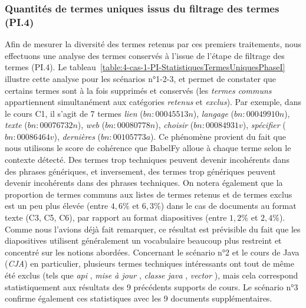 \bigskip




\subsubsection{Quantités de termes uniques issus du filtrage des termes (PI.4)}
\label{subsubsection:Evaluation:DeroulementExperimentations:ValidationStructurelle:ResultatsTermesUniquesFiltrageTermes}

Afin de mesurer la diversité des termes retenus par ces premiers traitements, nous effectuons une analyse des termes  conservés à l'issue de l'étape de filtrage des termes (PI.4).
Le tableau~\ref{table:4-cas-1-PI-StatistiquesTermesUniquesPhaseI} illustre cette analyse pour les scénarios n°1-2-3, et permet de constater que certains termes sont à la fois supprimés et conservés (les \textit{termes communs} appartiennent simultanément aux catégories \textit{retenus} et \textit{exclus}).
Par exemple, dans le cours C1, il s'agit de 7 termes \og \textit{lien} \fg ($bn{:}00045513n$), \og \textit{langage} \fg ($bn{:}00049910n$), \og \textit{texte} \fg ($bn{:}00076732n$), \og \textit{web} \fg ($bn{:}00080778n$), \og \textit{choisir} \fg ($bn{:}00084931v$), \og \textit{spécifier} \fg ($bn{:}00086464v$), \og \textit{dernières} \fg ($bn{:}00105773a$).
Ce phénomène provient du fait que nous utilisons le score de cohérence que BabelFy alloue à chaque terme selon le contexte détecté.
Des termes trop techniques peuvent devenir incohérents dans des phrases génériques, et inversement, des termes trop génériques peuvent devenir incohérents dans des phrases techniques.
On notera également que la proportion de termes communs aux listes de termes retenus et de termes exclus est un peu plus élevée (entre $ 4,6 \% $ et $ 6,3 \% $) dans le cas de documents au format texte (C3, C5, C6), par rapport au format diapositives (entre $ 1,2 \% $ et $ 2,4 \% $).
Comme nous l'avions déjà fait remarquer, ce résultat est prévisible du fait que les diapositives utilisent généralement un vocabulaire beaucoup plus restreint et concentré sur les notions abordées.
Concernant le scénario n°2 et le cours de Java (\textit{CJA}) en particulier, plusieurs termes techniques intéressants ont tout de même été exclus (tels que \og \textit{api} \fg, \og \textit{mise à jour} \fg, \og \textit{classe java} \fg, \og \textit{vector} \fg), mais cela correspond statistiquement aux résultats des 9 précédents supports de cours.
Le scénario n°3 confirme également ces statistiques avec les 9 documents supplémentaires.




